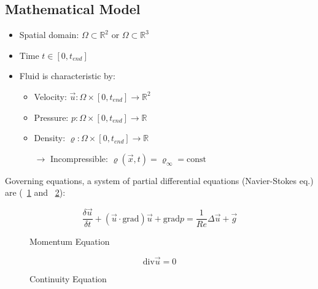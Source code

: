 \documentclass[a4paper,11pt]{scrartcl}
\begin{document}
\subsection{Mathematical Model}
\begin{itemize}
	\item Spatial domain: $\Omega \subset  \mathds{R}^2$ or $\Omega \subset  \mathds{R}^3$
	\item Time $t \in [0, t_{end}]$
	\item Fluid is characteristic by:
	\begin{itemize}
		\item Velocity: $\vec{u} : \Omega \times [0, t_{end}] \rightarrow \mathds{R}^2$
		\item Pressure: $p : \Omega \times [0, t_{end}] \rightarrow \mathds{R}$
		\item Density: $ \varrho : \Omega \times [0, t_{end}] \rightarrow \mathds{R}$
		\item[$\rightarrow$] Incompressible: $\varrho(\vec{x},t) = \varrho_\infty = \text{const}$
	\end{itemize}
\end{itemize}
Governing equations, a system of partial differential equations (Navier-Stokes eq.) are (~\ref{fig:momentum} and ~\ref{fig:cont-eq}):

\begin{figure}[H]
	\centering
	\[\frac{\delta \vec{u}}{\delta t} + ( \vec{u} \cdot \text{grad}) \vec{u} + \text{grad} p = \frac{1}{Re} \Delta \vec{u} + \vec{g}\]
	\renewcommand{\thefigure}{2.1.a}
    \caption{Momentum Equation}
	\label{fig:momentum}
\end{figure}
\begin{figure}[H]
	\centering
	\[\text{div} \vec{u} = 0\]
	\renewcommand{\thefigure}{2.1.b}
    \caption{Continuity Equation}
	\label{fig:cont-eq}
\end{figure}
\end{document}
